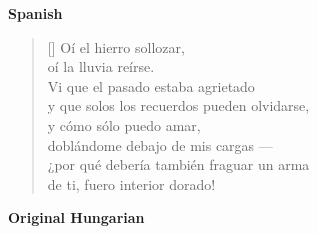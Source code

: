 \documentclass[a4paper,12pt,twoside,final]{book}
\begin{document}
\bigskip

\noindent \textbf{Spanish}


\settowidth{\versewidth}{y que solos los recuerdos pueden olvidarse,}

\begin{verse}[\versewidth]
  Oí el hierro sollozar, \\
  oí la lluvia reírse. \\
  Vi que el pasado estaba agrietado \\
  y que solos los recuerdos pueden olvidarse, \\
  y cómo sólo puedo amar, \\
  doblándome debajo de mis cargas --- \\
  ¿por qué debería también fraguar un arma \\
  de ti, fuero interior dorado! \\
\end{verse}

\newpage


\noindent \textbf{Original Hungarian}



\settowidth{\versewidth}{s hogy nem tudok mást, mint szeretni,}
\end{document}
